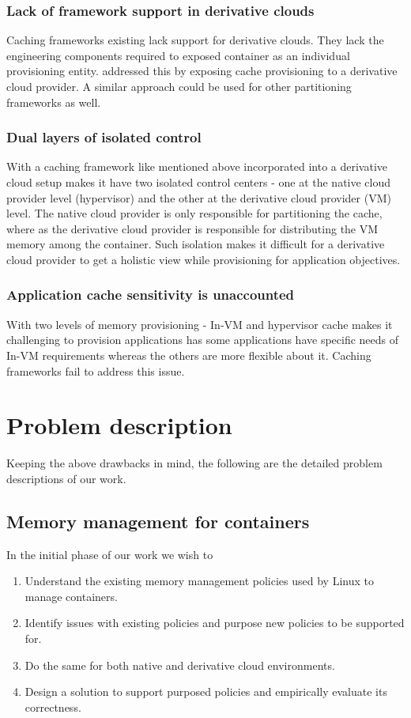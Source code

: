       \subsubsection{Lack of framework support in derivative clouds}
	Caching frameworks existing lack support for derivative clouds. They lack the engineering components required to 
	exposed container as an individual provisioning entity. \dd{} addressed this by exposing cache provisioning to a
	derivative cloud provider. A similar approach could be used for other partitioning frameworks as well.
      
      \subsubsection{Dual layers of isolated control}
	With a caching framework like mentioned above incorporated into a derivative cloud setup makes it have two isolated
	control centers - one at the native cloud provider level (hypervisor) and the other at the derivative 
	cloud provider (VM) level. The native cloud provider is only responsible for partitioning the cache, where as the 
	derivative cloud provider is responsible for distributing the VM memory among the container. Such isolation makes
	it difficult for a derivative cloud provider to get a holistic view while provisioning for application objectives. 
	
      \subsubsection{Application cache sensitivity is unaccounted}
	With two levels of memory provisioning - In-VM and hypervisor cache makes it challenging to provision applications 
	has some applications have specific needs of In-VM requirements whereas the others are more flexible about it. 
	Caching frameworks fail to address this issue.
    
  \section{Problem description}  
    Keeping the above drawbacks in mind, the following are the detailed problem descriptions of our work.
  
   \subsection{Memory management for containers}
      In the initial phase of our work we wish to 
      \begin{enumerate}
	\item Understand the existing memory management policies used by Linux to manage containers.
	\item Identify issues with existing policies and purpose new policies to be supported for.
	\item Do the same for both native and derivative cloud environments. 
	\item Design a solution to support purposed policies and empirically evaluate its correctness.
      \end{enumerate}

